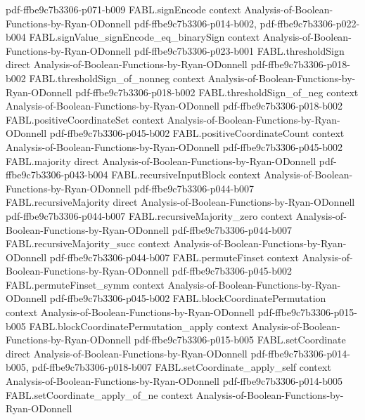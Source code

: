\begin{theorem}
  {pdf-ffbe9c7b3306-p071-b009}
\proofstep
  {FABL.signEncode}
  {context}
  {Analysis-of-Boolean-Functions-by-Ryan-ODonnell}
  {pdf-ffbe9c7b3306-p014-b002,
    pdf-ffbe9c7b3306-p022-b004}
\proofstep
  {FABL.signValue_signEncode_eq_binarySign}
  {context}
  {Analysis-of-Boolean-Functions-by-Ryan-ODonnell}
  {pdf-ffbe9c7b3306-p023-b001}
\proofstep
  {FABL.thresholdSign}
  {direct}
  {Analysis-of-Boolean-Functions-by-Ryan-ODonnell}
  {pdf-ffbe9c7b3306-p018-b002}
\proofstep
  {FABL.thresholdSign_of_nonneg}
  {context}
  {Analysis-of-Boolean-Functions-by-Ryan-ODonnell}
  {pdf-ffbe9c7b3306-p018-b002}
\proofstep
  {FABL.thresholdSign_of_neg}
  {context}
  {Analysis-of-Boolean-Functions-by-Ryan-ODonnell}
  {pdf-ffbe9c7b3306-p018-b002}
\proofstep
  {FABL.positiveCoordinateSet}
  {context}
  {Analysis-of-Boolean-Functions-by-Ryan-ODonnell}
  {pdf-ffbe9c7b3306-p045-b002}
\proofstep
  {FABL.positiveCoordinateCount}
  {context}
  {Analysis-of-Boolean-Functions-by-Ryan-ODonnell}
  {pdf-ffbe9c7b3306-p045-b002}
\proofstep
  {FABL.majority}
  {direct}
  {Analysis-of-Boolean-Functions-by-Ryan-ODonnell}
  {pdf-ffbe9c7b3306-p043-b004}
\proofstep
  {FABL.recursiveInputBlock}
  {context}
  {Analysis-of-Boolean-Functions-by-Ryan-ODonnell}
  {pdf-ffbe9c7b3306-p044-b007}
\proofstep
  {FABL.recursiveMajority}
  {direct}
  {Analysis-of-Boolean-Functions-by-Ryan-ODonnell}
  {pdf-ffbe9c7b3306-p044-b007}
\proofstep
  {FABL.recursiveMajority_zero}
  {context}
  {Analysis-of-Boolean-Functions-by-Ryan-ODonnell}
  {pdf-ffbe9c7b3306-p044-b007}
\proofstep
  {FABL.recursiveMajority_succ}
  {context}
  {Analysis-of-Boolean-Functions-by-Ryan-ODonnell}
  {pdf-ffbe9c7b3306-p044-b007}
\proofstep
  {FABL.permuteFinset}
  {context}
  {Analysis-of-Boolean-Functions-by-Ryan-ODonnell}
  {pdf-ffbe9c7b3306-p045-b002}
\proofstep
  {FABL.permuteFinset_symm}
  {context}
  {Analysis-of-Boolean-Functions-by-Ryan-ODonnell}
  {pdf-ffbe9c7b3306-p045-b002}
\proofstep
  {FABL.blockCoordinatePermutation}
  {context}
  {Analysis-of-Boolean-Functions-by-Ryan-ODonnell}
  {pdf-ffbe9c7b3306-p015-b005}
\proofstep
  {FABL.blockCoordinatePermutation_apply}
  {context}
  {Analysis-of-Boolean-Functions-by-Ryan-ODonnell}
  {pdf-ffbe9c7b3306-p015-b005}
\proofstep
  {FABL.setCoordinate}
  {direct}
  {Analysis-of-Boolean-Functions-by-Ryan-ODonnell}
  {pdf-ffbe9c7b3306-p014-b005,
    pdf-ffbe9c7b3306-p018-b007}
\proofstep
  {FABL.setCoordinate_apply_self}
  {context}
  {Analysis-of-Boolean-Functions-by-Ryan-ODonnell}
  {pdf-ffbe9c7b3306-p014-b005}
\proofstep
  {FABL.setCoordinate_apply_of_ne}
  {context}
  {Analysis-of-Boolean-Functions-by-Ryan-ODonnell}

\end{theorem}
